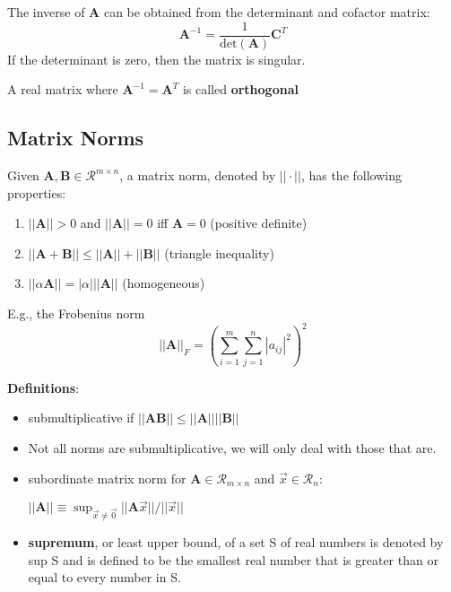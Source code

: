 \documentclass[12pt]{article}
\newcommand{\ve}[1]{\ensuremath{\mathbf{#1}}}
\begin{document}
The inverse of $\ve{A}$ can be obtained from the determinant and cofactor matrix:
%
\begin{equation}
\ve{A}^{-1} = \frac{1}{\text{det}(\ve{A})}\ve{C}^T \nonumber
\end{equation}
%
If the determinant is zero, then the matrix is singular.

A real matrix where $\ve{A}^{-1} = \ve{A}^T$ is called \textbf{orthogonal}


\subsection{Matrix Norms}
Given $\ve{A}, \ve{B} \in \mathcal{R}^{m \times n}$, a matrix norm, denoted by $|| \cdot ||$, has the following properties:
%
\begin{enumerate}
\item $||\ve{A}|| > 0$ and $||\ve{A}|| = 0$ iff $\ve{A} = 0$ (positive definite)
\item $||\ve{A} + \ve{B}|| \leq ||\ve{A}|| + ||\ve{B}||$ (triangle inequality)
\item $||\alpha \ve{A}|| = |\alpha| ||\ve{A}||$ (homogeneous)
\end{enumerate}

E.g., the Frobenius norm 
%
\begin{equation}
||\ve{A}||_F = ( \sum_{i=1}^m \sum_{j=1}^n |a_{ij}|^2 )^2 \nonumber
\end{equation}

\textbf{Definitions}:
\begin{itemize}
\item submultiplicative if $||\ve{A} \ve{B}|| \leq ||\ve{A}|| ||\ve{B}||$

\item Not all norms are submultiplicative, we will only deal with those that are. 

\item subordinate matrix norm for $\ve{A} \in \mathcal{R}_{m \times n}$ and $\vec{x} \in \mathcal{R}_n$:

$||\ve{A}|| \equiv \displaystyle \sup_{\vec{x} \neq \vec{0}} ||\ve{A}\vec{x}|| / ||\vec{x}||$

\item \textbf{supremum}, or least upper bound, of a set S of real numbers is denoted by sup S and is defined to be the smallest real number that is greater than or equal to every number in S.
\end{itemize}
\end{document}
